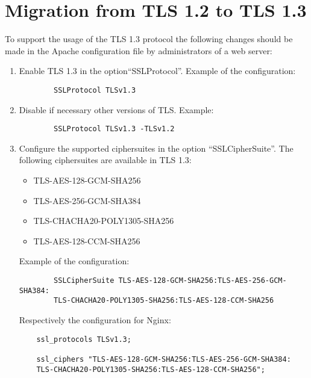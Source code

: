 \chapter{Migration from TLS 1.2 to TLS 1.3}
\label{chap:migration}

To support the usage of the TLS 1.3 protocol the following changes should be made in the Apache configuration file by administrators of a web server:\\
\begin{enumerate}
	\item Enable TLS 1.3 in the option“SSLProtocol”. Example of the configuration:
    \begin{verbatim}
        SSLProtocol TLSv1.3
    \end{verbatim}
    \item Disable if necessary other versions of TLS. Example: 
    \begin{verbatim}
        SSLProtocol TLSv1.3 -TLSv1.2
    \end{verbatim}
    \item Configure the supported ciphersuites in the option “SSLCipherSuite”. The following ciphersuites are available in TLS 1.3:
    \begin{itemize}
        \item TLS-AES-128-GCM-SHA256
        \item TLS-AES-256-GCM-SHA384
        \item TLS-CHACHA20-POLY1305-SHA256
        \item TLS-AES-128-CCM-SHA256
    \end{itemize}
    Example of the configuration:
    \begin{verbatim}
        SSLCipherSuite TLS-AES-128-GCM-SHA256:TLS-AES-256-GCM-SHA384:
        TLS-CHACHA20-POLY1305-SHA256:TLS-AES-128-CCM-SHA256
    \end{verbatim}
    Respectively the configuration for Nginx:
    \begin{verbatim}
    ssl_protocols TLSv1.3;
    
    ssl_ciphers "TLS-AES-128-GCM-SHA256:TLS-AES-256-GCM-SHA384:
    TLS-CHACHA20-POLY1305-SHA256:TLS-AES-128-CCM-SHA256";
    \end{verbatim}

\end{enumerate}

